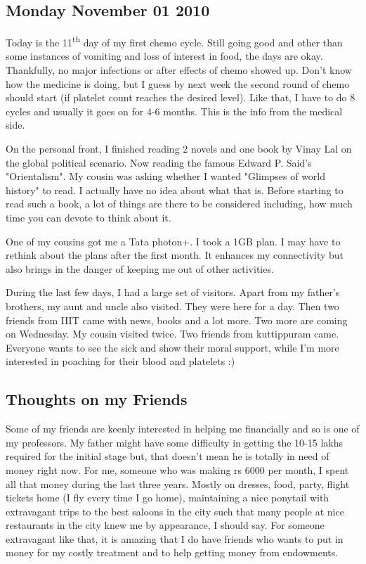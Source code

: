 \vskip 2pt
{\engtext
\subsection*{Monday November 01 2010}

Today is the 11\textsuperscript{th} day of my first chemo cycle. Still going good and other
than some instances of vomiting and loss of interest in food, the days are okay.
Thankfully, no major infections or after effects of chemo showed up. 
Don't know how the medicine is doing, but I guess by next week the second 
round of chemo should start (if platelet count reaches the desired level). 
Like that, I have to do 8 cycles and usually it goes on for 4-6 months. 
This is the info from the medical side.

On the personal front, I finished reading 2 novels and one book by Vinay 
Lal on the global political scenario. Now reading the famous Edward P. Said's 
"Orientalism". My cousin was asking whether I wanted "Glimpses of world history" 
to read. I actually have no idea about what that is. Before starting to read such a book, 
a lot of things are there to be considered including, how much time you can devote to 
think about it. 

One of my cousins got me a Tata photon+. I took a 1GB plan. I may have to rethink 
about the plans after the first month. It enhances my connectivity but also brings 
in the danger of keeping me out of other activities.

During the last few days, I had a large set of visitors. Apart from my father's brothers,
my aunt and uncle also visited. They were here for a day. Then two friends from IIIT 
came with news, books and a lot more. Two more are coming on Wednesday. My cousin visited 
twice. Two friends from kuttippuram came. Everyone wants to see the sick and 
show their moral support, while I'm more interested in poaching for their blood and 
platelets :) 

\subsection*{Thoughts on my Friends}

Some of my friends are keenly interested in helping me financially and so is one of my professors. 
My father might have some difficulty in getting the 10-15 lakhs required for the initial stage 
but, that doesn't mean he is totally in need of money right now. For me, someone who was making 
rs 6000 per month, I spent all that money during the last three years. Mostly on dresses, food, party, 
flight tickets home (I fly every time I go home), maintaining a nice ponytail with extravagant trips to the best 
saloons in the city such that many people at nice restaurants in the city knew me by appearance, I should say. 
For someone extravagant like that, it is amazing that I do have friends who wants to put in money 
for my costly treatment and to help getting money from endowments. 

}
